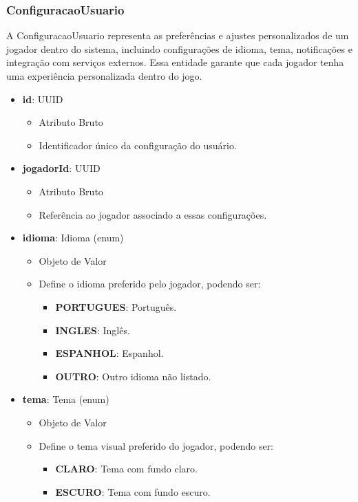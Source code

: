     \subsubsection{ConfiguracaoUsuario}
    A ConfiguracaoUsuario representa as preferências e ajustes personalizados de um jogador dentro do sistema, incluindo configurações de idioma, tema, notificações e integração com serviços externos. Essa entidade garante que cada jogador tenha uma experiência personalizada dentro do jogo.
    \begin{itemize}
        \item \textbf{id}: UUID  
              \begin{itemize}
                  \item Atributo Bruto
                  \item Identificador único da configuração do usuário.
              \end{itemize}
    
        \item \textbf{jogadorId}: UUID  
              \begin{itemize}
                  \item Atributo Bruto
                  \item Referência ao jogador associado a essas configurações.
              \end{itemize}
    
        \item \textbf{idioma}: Idioma (enum)  
              \begin{itemize}
                  \item Objeto de Valor
                  \item Define o idioma preferido pelo jogador, podendo ser:
                  \begin{itemize}
                      \item \textbf{PORTUGUES}: Português.
                      \item \textbf{INGLES}: Inglês.
                      \item \textbf{ESPANHOL}: Espanhol.
                      \item \textbf{OUTRO}: Outro idioma não listado.
                  \end{itemize}
              \end{itemize}
    
        \item \textbf{tema}: Tema (enum)  
              \begin{itemize}
                  \item Objeto de Valor
                  \item Define o tema visual preferido do jogador, podendo ser:
                  \begin{itemize}
                      \item \textbf{CLARO}: Tema com fundo claro.
                      \item \textbf{ESCURO}: Tema com fundo escuro.
                  \end{itemize}
              \end{itemize}
    

\end{itemize}
